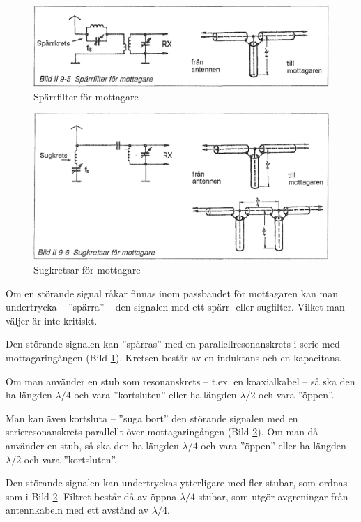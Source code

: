 \begin{figure}
  \includegraphics[width=\textwidth]{images/bild_2_9-05}
  \caption{Spärrfilter för mottagare}
  \label{fig:bildII9-5}
\end{figure}

\begin{figure}
  \includegraphics[width=\textwidth]{images/bild_2_9-06}
  \caption{Sugkretsar för mottagare}
  \label{fig:bildII9-6}
\end{figure}

Om en störande signal råkar finnas inom passbandet för mottagaren kan
man undertrycka -- ''spärra'' -- den signalen med ett spärr- eller
sugfilter. Vilket man väljer är inte kritiskt.

Den störande signalen kan ''spärras'' med en parallellresonanskrets i
serie med mottagaringången (Bild \ref{fig:bildII9-5}). Kretsen består av en
induktans och en kapacitans.

Om man använder en stub som resonanskrets -- t.ex. en koaxialkabel -- så
ska den ha längden \(\lambda/4\) och vara ''kortsluten'' eller ha
längden \(\lambda/2\) och vara ''öppen''.

Man kan även kortsluta -- ''suga bort'' den störande signalen med en
serieresonanskrets parallellt över mottagaringången (Bild \ref{fig:bildII9-6}). Om
man då använder en stub, så ska den ha längden \(\lambda/4\) och
vara ''öppen'' eller ha längden \(\lambda/2\) och vara ''kortsluten''.

Den störande signalen kan undertryckas ytterligare med fler stubar,
som ordnas som i Bild \ref{fig:bildII9-6}. Filtret består då av öppna
\(\lambda/4\)-stubar, som utgör avgreningar från antennkabeln med ett
avstånd av \(\lambda/4\).

